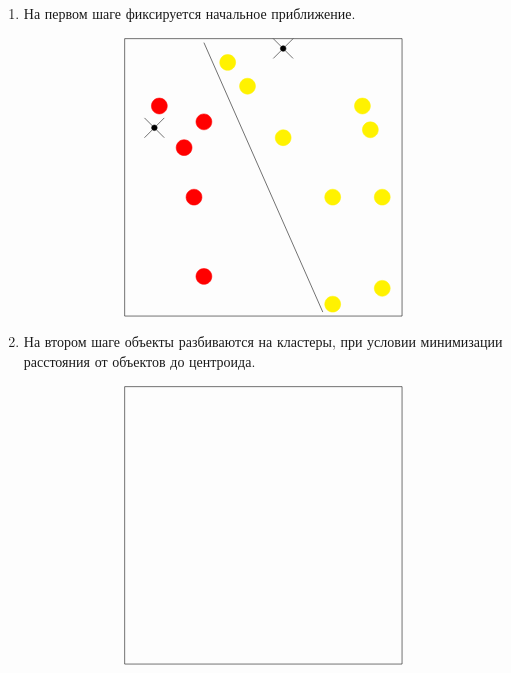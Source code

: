 \begin{enumerate}

\item На первом шаге фиксируется начальное приближение. 


\[
\begin{tikzpicture}
    \begin{scope}[xshift=7.5cm, yshift=7.5cm]
        \draw (-3.5, 3.5 ) -- (3.5, 3.5);
        \draw (-3.5, -3.5) -- (3.5, -3.5);
        \draw (-3.5, -3.5) -- (-3.5, 3.5);
        \draw (3.5, 3.5) -- (3.5, -3.5);

        \draw[red, fill=red] (-1.5, -2.5) circle (0.2);
        \draw[red, fill=red] (-1.75, -0.5) circle (0.2);
        \draw[red, fill=red] (-1.5, 1.4) circle (0.2);
        \draw[red, fill=red] (-2, 0.75) circle (0.2);
        \draw[red, fill=red] (-2.625, 1.8) circle (0.2);
        \draw[yellow, fill=yellow] (1.75, -3.2) circle (0.2);
        \draw[yellow, fill=yellow] (3, -2.8) circle (0.2);
        \draw[yellow, fill=yellow] (3, -0.5) circle (0.2);
        \draw[yellow, fill=yellow] (1.75, -0.5) circle (0.2);
        \draw[yellow, fill=yellow] (2.7, 1.2) circle (0.2);
        \draw[yellow, fill=yellow] (2.5, 1.8) circle (0.2);
        \draw[yellow, fill=yellow] (0.5, 1) circle (0.2);
        \draw[yellow, fill=yellow] (-0.4, 2.3) circle (0.2);
        \draw[yellow, fill=yellow] (-0.9, 2.9) circle (0.2); 
        \draw[black] (-3, 1.5) -- (-2.5, 1);
        \draw[black] (-3, 1) -- (-2.5, 1.5);
        \draw[black] (0.25, 3) -- (0.75, 3.5);
        \draw[black] (0.25, 3.5) -- (0.75, 3);
        \draw[black] (1.5, -3.4) -- (-1.5, 3.4);
        \filldraw[black](0.5, 3.25) circle (2pt);
        \filldraw[black] (-2.75 , 1.25) circle (2pt);

        
    \end{scope}
\end{tikzpicture}
\]

\item На втором шаге объекты разбиваются на кластеры, при условии минимизации расстояния от объектов до центроида. 

\[
\begin{tikzpicture}
    \begin{scope}[xshift=7.5cm, yshift=7.5cm]
        \draw (-3.5, 3.5 ) -- (3.5, 3.5);
        \draw (-3.5, -3.5) -- (3.5, -3.5);
        \draw (-3.5, -3.5) -- (-3.5, 3.5);
        \draw (3.5, 3.5) -- (3.5, -3.5);


\end{scope}
\end{tikzpicture}\]
\end{enumerate}

